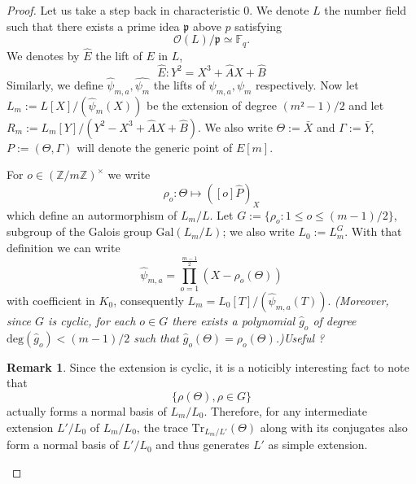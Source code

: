 \documentclass[12pt]{article}
\theoremstyle{plain}
\theoremstyle{definition}
\newtheorem*{remark}{Remark}
\def\Z{\ensuremath{\mathbb{Z}}}
\def\F{\ensuremath{\mathbb{F}}}
\begin{document}
\begin{proof}
Let us take a step back in characteristic $0$. We denote $L$ the number field 
such that there exists a prime idea $\mathfrak{p}$ above $p$ satisfying 
\begin{equation}
\mathcal{O}(L)/\mathfrak{p} \simeq \F_q.
\end{equation}
We denotes by $\widehat{E}$ the lift of $E$ in $L$,
\[
\widehat{E} : Y^2 = X^3 + \widehat{A}X + \widehat{B}
\]
Similarly, we define $\widehat{\psi}_{m,a}, \widehat{\psi_m}$ the lifts of 
$\psi_{m,a}, \psi_m$ respectively. Now let $L_m := 
L[X]/(\widehat{\psi}_m(X))$ be the extension of degree $(m²-1)/2$ and let 
$R_m := L_m[Y]/(Y^2 - X^3 + \widehat{A}X + \widehat{B})$. We also write $\Theta
:=\bar{X}$ and $\Gamma:=\bar{Y}$, $P:=(\Theta, \Gamma)$ will denote the generic 
point of $E[m]$.

For $o\in(\Z/m\Z)^{\times}$ we write
\begin{equation}
\rho_o : \Theta \mapsto ([o]\widehat{P})_X
\end{equation}
which define an autormorphism of $L_m/L$. Let $G := \lbrace{\rho_o : 1 \leq o
\leq (m-1)/2}\rbrace$, subgroup of the Galois group $\text{Gal}(L_m/L)$; we also 
write $L_0 := L_m^G$. With that definition we can write 
\begin{equation}
\widehat{\psi}_{m,a}=\prod_{o=1}^{\tfrac{m-1}{2}}{(X-\rho_o(\Theta))}
\end{equation}
with coefficient in $K_0$, consequently $L_m = L_0[T]/(\widehat{\psi}_{m,a}(T))$.
\emph{(Moreover, since $G$ is cyclic, for each $o\in G$ there exists a polynomial
$\widehat{g}_o$ of degree $\text{deg}(\widehat{g}_o) < (m-1)/2$ such that
$\widehat{g}_o(\Theta) = \rho_o(\Theta)$.)Useful ?}

\begin{remark}
Since the extension is cyclic, it is a noticibly interesting fact to note that
\[
\lbrace{\rho(\Theta), \rho\in G}\rbrace
\]
actually forms a normal basis of $L_m/L_0$.
Therefore, for any intermediate extension $L'/L_0$ of $L_m/L_0$, the trace
$\text{Tr}_{L_m/L'}(\Theta)$ along with its conjugates also form a normal basis
of $L'/L_0$ and thus generates $L'$ as simple extension.
\end{remark}


\end{proof}
\end{document}
